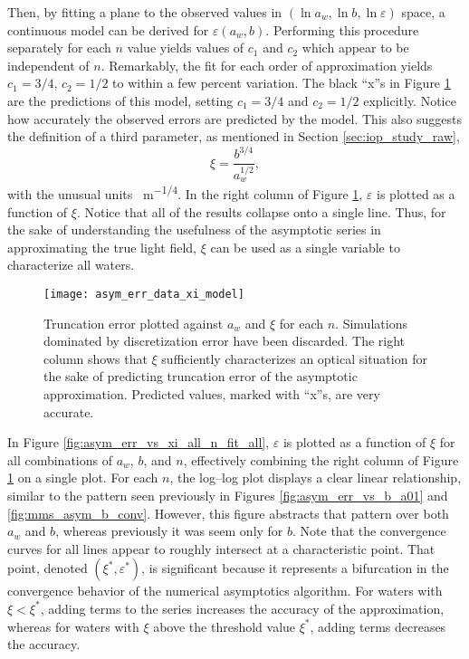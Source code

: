 Then, by fitting a plane to the observed values in $(\ln a_w, \ln b, \ln \varepsilon)$ space, a continuous model can be derived for $\varepsilon(a_w, b)$.
Performing this procedure separately for each $n$ value yields values of $c_1$ and $c_2$ which appear to be independent of $n$.
Remarkably, the fit for each order of approximation yields $c_1=3/4$, $c_2=1/2$ to within a few percent variation.
The black ``x''s in Figure \ref{fig:asym_err_data_xi_model} are the predictions of this model, setting $c_1=3/4$ and $c_2=1/2$ explicitly.
Notice how accurately the observed errors are predicted by the model.
This also suggests the definition of a third parameter, as mentioned in Section \ref{sec:iop_study_raw},
\begin{equation}
  \label{eqn:xi}
  \xi = \frac{b^{3/4}}{a_w^{1/2}},
\end{equation}
with the unusual units \SI{}{\m^{-1/4}}.
In the right column of Figure \ref{fig:asym_err_data_xi_model}, $\varepsilon$ is plotted as a function of $\xi$.
Notice that all of the results collapse onto a single line.
Thus, for the sake of understanding the usefulness of the asymptotic series in approximating the true light field, $\xi$ can be used as a single variable to characterize all waters.

\begin{figure}[H]
  \centering
  \texttt{[image: asym\_err\_data\_xi\_model]}
  \caption{Truncation error plotted against $a_w$ and $\xi$ for each $n$. Simulations dominated by discretization error have been discarded. The right column shows that $\xi$ sufficiently characterizes an optical situation for the sake of predicting truncation error of the asymptotic approximation. Predicted values, marked with ``x''s, are very accurate.}
  \label{fig:asym_err_data_xi_model}
\end{figure}

In Figure \ref{fig:asym_err_vs_xi_all_n_fit_all}, $\varepsilon$ is plotted as a function of $\xi$ for all combinations of $a_w$, $b$, and $n$, effectively combining the right column of Figure \ref{fig:asym_err_data_xi_model} on a single plot.
For each $n$, the log--log plot displays a clear linear relationship, similar to the pattern seen previously in Figures \ref{fig:asym_err_vs_b_a01} and \ref{fig:mms_asym_b_conv}.
However, this figure abstracts that pattern over both $a_w$ and $b$, whereas previously it was seem only for $b$.
Note that the convergence curves for all lines appear to roughly intersect at a characteristic point.
That point, denoted $(\xi^*, \varepsilon^*)$, is significant because it represents a bifurcation in the convergence behavior of the numerical asymptotics algorithm.
For waters with $\xi < \xi^*$, adding terms to the series increases the accuracy of the approximation, whereas for waters with $\xi$ above the threshold value $\xi^*$, adding terms decreases the accuracy.

